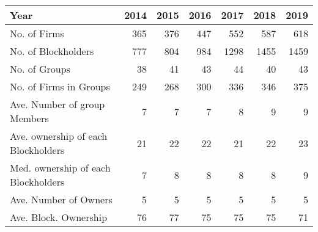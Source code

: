 \begin{tabular}{lrrrrrr}
\toprule
Year &  2014 &  2015 &  2016 &  2017 &  2018 &  2019 \\
\midrule
No. of Firms                        &   365 &   376 &   447 &   552 &   587 &   618 \\
No. of Blockholders                 &   777 &   804 &   984 &  1298 &  1455 &  1459 \\
No. of Groups                       &    38 &    41 &    43 &    44 &    40 &    43 \\
No. of Firms in Groups              &   249 &   268 &   300 &   336 &   346 &   375 \\
Ave. Number of group Members        &     7 &     7 &     7 &     8 &     9 &     9 \\
Ave. ownership of each Blockholders &    21 &    22 &    22 &    21 &    22 &    23 \\
Med. ownership of each Blockholders &     7 &     8 &     8 &     8 &     8 &     9 \\
Ave. Number of Owners               &     5 &     5 &     5 &     5 &     5 &     5 \\
Ave. Block. Ownership               &    76 &    77 &    75 &    75 &    75 &    71 \\
\bottomrule
\end{tabular}
